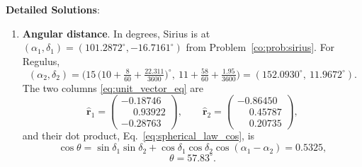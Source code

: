 \textbf{Detailed Solutions}:
\begin{enumerate}[label=(\alph*)]
	\item \textbf{Angular distance}. In degrees, Sirius is at $(\alpha_1,\delta_1)=(101.2872^\circ,-16.7161^\circ)$ from Problem~\ref{co:prob:sirius}. For Regulus,
	\[
	(\alpha_2,\delta_2)=\Big(15\,\big(10+\tfrac{8}{60}+\tfrac{22.311}{3600}\big)^\circ,\ 11+\tfrac{58}{60}+\tfrac{1.95}{3600}\Big)=(152.0930^\circ,\ 11.9672^\circ).
	\]
	The two columns \eqref{eq:unit_vector_eq} are
	\[
	\hat{\mathbf r}_1=\begin{pmatrix}-0.18746\\ \phantom{-}0.93922\\ -0.28763\end{pmatrix},\qquad
	\hat{\mathbf r}_2=\begin{pmatrix}-0.86450\\ \phantom{-}0.45787\\ \phantom{-}0.20735\end{pmatrix},
	\]
	and their dot product, Eq.~\eqref{eq:spherical_law_cos}, is
	\[
	\cos\theta=\sin\delta_1\sin\delta_2+\cos\delta_1\cos\delta_2\cos(\alpha_1-\alpha_2)=0.5325,
	\]
	\[
	\boxed{\theta=57.83^\circ .}
	\]


\end{enumerate}
